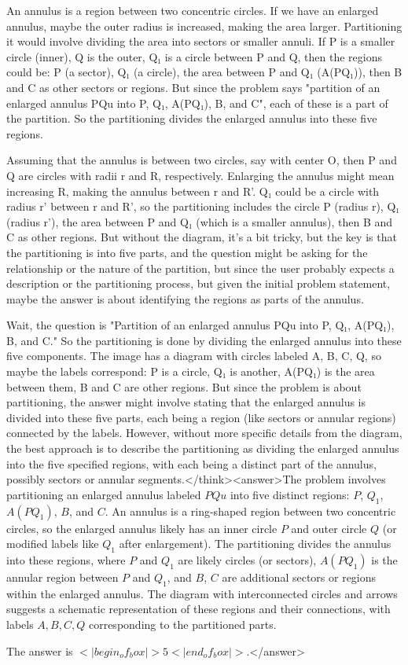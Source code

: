 An annulus is a region between two concentric circles. If we have an enlarged annulus, maybe the outer radius is increased, making the area larger. Partitioning it would involve dividing the area into sectors or smaller annuli. If P is a smaller circle (inner), Q is the outer, Q₁ is a circle between P and Q, then the regions could be: P (a sector), Q₁ (a circle), the area between P and Q₁ (A(PQ₁)), then B and C as other sectors or regions. But since the problem says "partition of an enlarged annulus PQu into P, Q₁, A(PQ₁), B, and C", each of these is a part of the partition. So the partitioning divides the enlarged annulus into these five regions. 

Assuming that the annulus is between two circles, say with center O, then P and Q are circles with radii r and R, respectively. Enlarging the annulus might mean increasing R, making the annulus between r and R'. Q₁ could be a circle with radius r' between r and R', so the partitioning includes the circle P (radius r), Q₁ (radius r'), the area between P and Q₁ (which is a smaller annulus), then B and C as other regions. But without the diagram, it's a bit tricky, but the key is that the partitioning is into five parts, and the question might be asking for the relationship or the nature of the partition, but since the user probably expects a description or the partitioning process, but given the initial problem statement, maybe the answer is about identifying the regions as parts of the annulus. 

Wait, the question is "Partition of an enlarged annulus PQu into P, Q₁, A(PQ₁), B, and C." So the partitioning is done by dividing the enlarged annulus into these five components. The image has a diagram with circles labeled A, B, C, Q, so maybe the labels correspond: P is a circle, Q₁ is another, A(PQ₁) is the area between them, B and C are other regions. But since the problem is about partitioning, the answer might involve stating that the enlarged annulus is divided into these five parts, each being a region (like sectors or annular regions) connected by the labels. However, without more specific details from the diagram, the best approach is to describe the partitioning as dividing the enlarged annulus into the five specified regions, with each being a distinct part of the annulus, possibly sectors or annular segments.</think><answer>The problem involves partitioning an enlarged annulus labeled \( PQu \) into five distinct regions: \( P \), \( Q_1 \), \( A(PQ_1) \), \( B \), and \( C \). An annulus is a ring-shaped region between two concentric circles, so the enlarged annulus likely has an inner circle \( P \) and outer circle \( Q \) (or modified labels like \( Q_1 \) after enlargement). The partitioning divides the annulus into these regions, where \( P \) and \( Q_1 \) are likely circles (or sectors), \( A(PQ_1) \) is the annular region between \( P \) and \( Q_1 \), and \( B \), \( C \) are additional sectors or regions within the enlarged annulus. The diagram with interconnected circles and arrows suggests a schematic representation of these regions and their connections, with labels \( A, B, C, Q \) corresponding to the partitioned parts.  

The answer is \(<|begin_of_box|>5<|end_of_box|>\).</answer>